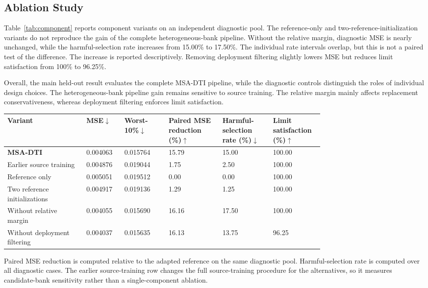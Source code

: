 \documentclass[a4paper,fleqn]{cas-sc}
\begin{document}
\subsection{Ablation Study}
\label{subsec:component}

Table~\ref{tab:component} reports component variants on an independent
diagnostic pool. The reference-only and two-reference-initialization variants do not reproduce
the gain of the complete heterogeneous-bank pipeline. Without the relative margin,
diagnostic MSE is nearly unchanged, while the harmful-selection rate increases
from 15.00\% to 17.50\%. The individual rate intervals overlap, but this is
not a paired test of the difference. The increase is reported descriptively. Removing deployment
filtering slightly lowers MSE but reduces limit satisfaction from 100\% to
96.25\%.

Overall, the main held-out result evaluates the complete MSA-DTI pipeline,
while the diagnostic controls distinguish the roles of individual design
choices. The heterogeneous-bank pipeline gain remains sensitive to source training. The
relative margin mainly affects replacement conservativeness, whereas
deployment filtering enforces limit satisfaction.

\begin{center}
\begin{minipage}{\linewidth}
\label{tab:component}
\centering
\scriptsize
\renewcommand{\arraystretch}{1.08}
\setlength{\tabcolsep}{2.2pt}
\begin{tabularx}{\linewidth}
{Y Z{0.12\linewidth} Z{0.14\linewidth} Z{0.17\linewidth} Z{0.16\linewidth} Z{0.16\linewidth}}
\toprule
Variant
& MSE$\downarrow$
& Worst-10\%$\downarrow$
& Paired MSE reduction (\%)$\uparrow$
& Harmful-selection rate (\%)$\downarrow$
& Limit satisfaction (\%)$\uparrow$ \\
\midrule
\textbf{MSA-DTI} & 0.004063 & 0.015764 & 15.79 & 15.00 & 100.00 \\
Earlier source training & 0.004876 & 0.019044 & 1.75 & 2.50 & 100.00 \\
Reference only & 0.005051 & 0.019512 & 0.00 & 0.00 & 100.00 \\
Two reference initializations & 0.004917 & 0.019136 & 1.29 & 1.25 & 100.00 \\
Without relative margin & 0.004055 & 0.015690 & 16.16 & 17.50 & 100.00 \\
Without deployment filtering & 0.004037 & 0.015635 & 16.13 & 13.75 & 96.25 \\
\bottomrule
\end{tabularx}
\vspace{2pt}
\par\footnotesize
Paired MSE reduction is computed relative to the adapted reference on the same
diagnostic pool. Harmful-selection rate is computed over all diagnostic
cases. The earlier source-training row changes the full source-training
procedure for the alternatives, so it measures candidate-bank sensitivity
rather than a single-component ablation.
\end{minipage}
\end{center}
\end{document}
